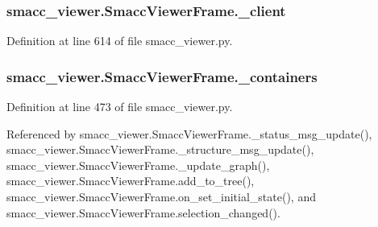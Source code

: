 \subsubsection[{\texorpdfstring{\+\_\+client}{_client}}]{\setlength{\rightskip}{0pt plus 5cm}smacc\+\_\+viewer.\+Smacc\+Viewer\+Frame.\+\_\+client\hspace{0.3cm}{\ttfamily [private]}}\hypertarget{classsmacc__viewer_1_1SmaccViewerFrame_a64056f729cac85e212d484b48704ace9}{}\label{classsmacc__viewer_1_1SmaccViewerFrame_a64056f729cac85e212d484b48704ace9}


Definition at line 614 of file smacc\+\_\+viewer.\+py.

\subsubsection[{\texorpdfstring{\+\_\+containers}{_containers}}]{\setlength{\rightskip}{0pt plus 5cm}smacc\+\_\+viewer.\+Smacc\+Viewer\+Frame.\+\_\+containers\hspace{0.3cm}{\ttfamily [private]}}\hypertarget{classsmacc__viewer_1_1SmaccViewerFrame_a00ea07c6cc068340230dcac273ad5e90}{}\label{classsmacc__viewer_1_1SmaccViewerFrame_a00ea07c6cc068340230dcac273ad5e90}


Definition at line 473 of file smacc\+\_\+viewer.\+py.



Referenced by smacc\+\_\+viewer.\+Smacc\+Viewer\+Frame.\+\_\+status\+\_\+msg\+\_\+update(), smacc\+\_\+viewer.\+Smacc\+Viewer\+Frame.\+\_\+structure\+\_\+msg\+\_\+update(), smacc\+\_\+viewer.\+Smacc\+Viewer\+Frame.\+\_\+update\+\_\+graph(), smacc\+\_\+viewer.\+Smacc\+Viewer\+Frame.\+add\+\_\+to\+\_\+tree(), smacc\+\_\+viewer.\+Smacc\+Viewer\+Frame.\+on\+\_\+set\+\_\+initial\+\_\+state(), and smacc\+\_\+viewer.\+Smacc\+Viewer\+Frame.\+selection\+\_\+changed().

